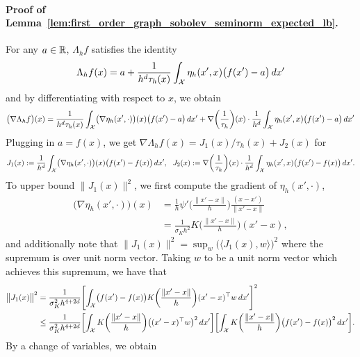 \paragraph{Proof of Lemma~\ref{lem:first_order_graph_sobolev_seminorm_expected_lb}.}
For any $a \in \mathbb{R}$, $\Lambda_hf$ satisfies the identity
\begin{equation*}
\Lambda_hf(x) = a + \frac{1}{h^d\tau_h(x)}\int_{\mathcal{X}} \eta_h(x',x)\bigl(f(x') - a\bigr)\,dx'
\end{equation*}
and by differentiating with respect to $x$,  we obtain
\begin{equation*}
\bigl(\nabla \Lambda_hf\bigr)(x)= \frac{1}{h^d\tau_h(x)}\int_{\mathcal{X}} \bigl(\nabla \eta_h(x',\cdot)\bigr)(x)\bigl(f(x') - a\bigr)\,dx' + \nabla\biggl(\frac{1}{\tau_h}\biggr)(x)\cdot \frac{1}{h^d}\int_{\mathcal{X}} \eta_h(x',x)\bigl(f(x') - a\bigr)\,dx'
\end{equation*} 
Plugging in $a = f(x)$, we get $\nabla\Lambda_hf(x) = J_1(x)/\tau_h(x) + J_2(x)$ for
\begin{equation*}
J_1(x) := \frac{1}{h^d}\int_{\mathcal{X}} \bigl(\nabla \eta_h(x',\cdot)\bigr)(x)\bigl(f(x') - f(x)\bigr)\,dx',~~ J_2(x) := \nabla\biggl(\frac{1}{\tau_h}\biggr)(x)\cdot \frac{1}{h^d}\int_{\mathcal{X}} \eta_h(x',x)\bigl(f(x') - f(x)\bigr)\,dx'.
\end{equation*}
To upper bound $\bigl\|J_1(x)\bigr\|^2$, we first compute the gradient of $\eta_h(x',\cdot)$,
\begin{align*}
\bigl(\nabla\eta_h(x',\cdot)\bigr)(x) & = \frac{1}{h} \psi'\biggl(\frac{\|x'  - x\|}{h}\biggr) \frac{(x - x')}{\|x' - x\|} \\
& = \frac{1}{\sigma_Kh^{2}} K\biggl(\frac{\|x' - x\|}{h}\biggr) (x' - x),
\end{align*}
and additionally note that $\|J_1(x)\|^2 = \sup_{w}\bigl(\langle J_1(x), w \rangle\bigr)^2$ where the supremum is over unit norm vector. Taking $w$ to be a unit norm vector which achieves this supremum, we have that
\begin{align*}
\bigl\|J_1(x)\bigr\|^2 & = \frac{1}{\sigma_K^2 h^{4 + 2d}} \Biggl[\int_{\mathcal{X}} \bigl(f(x') - f(x)\bigr)K\biggl(\frac{\|x' - x\|}{h}\biggr)(x' - x)^{\top}w\,dx'\Biggr]^2 \\
& \leq \frac{1}{\sigma_K^2 h^{4 + 2d}} \biggl[\int_{\mathcal{X}}K\biggl(\frac{\|x' - x\|}{h}\biggr)\bigl((x' - x)^{\top} w\bigr)^2\,dx'\biggr] \biggl[\int_{\mathcal{X}}K\biggl(\frac{\|x' - x\|}{h}\biggr)\bigl(f(x') - f(x)\bigr)^2\,dx'\biggr].
\end{align*}
By a change of variables, we obtain
